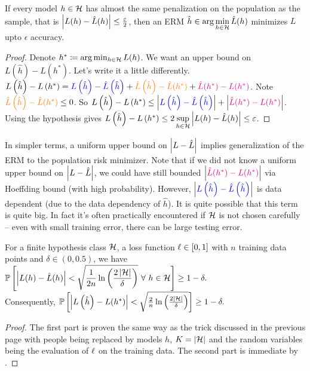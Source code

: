 \begin{prop}\label{prop:gen}
If every model $h\in {\mathcal{H}}$ has almost the same penalization on the population as the sample, that is $\left| L(h)-\hat L(h) \right| \le \frac{\varepsilon}{2}$, then an ERM $\hat h \in \arg\min\limits_{h\in{\mathcal{H}}} \hat L(h)$ minimizes $L$ upto $\epsilon$ accuracy.
\end{prop}
\begin{proof}
Denote $h^{*}\coloneqq \arg\min_{h\in{\mathcal{H}}}L(h)$. We want an upper bound on $L\left(\hat h\right) - L\left(h^{*}\right)$. Let's write it a little differently. $L\left(\hat h\right) - L\left(h^{*}\right) = {\color{blue}L\left(\hat h\right) - \hat L\left(\hat h\right)} + {\color{orange}\hat L\left(\hat h\right) - \hat L(h^{*})} + {\color{magenta}\hat L(h^{*}) - L(h^{*})}$. Note ${\color{orange}\hat L\left(\hat h\right) - \hat L(h^{*})} \le 0$. So $L\left(\hat h\right) - L\left(h^{*}\right) \le \left| {\color{blue}L\left(\hat h\right) - \hat L\left(\hat h\right)} \right| + \left| {\color{magenta}\hat L(h^{*}) - L(h^{*})} \right|$. Using the hypothesis gives $L\left(\hat h\right) - L\left(h^{*}\right) \le 2\sup\limits_{h\in{\mathcal{H}}} \left| L(h)-\hat L(h) \right| \le \varepsilon$.
\end{proof}

In simpler terms, a uniform upper bound on $\left| L-\hat L \right|$ implies generalization of the ERM to the population risk minimizer. Note that if we did not know a uniform upper bound on $\left| L-\hat L \right|$, we could have still bounded $\left| {\color{magenta}\hat L(h^{*}) - L(h^{*})} \right|$ via Hoeffding bound (with high probability). However, $\left| {\color{blue}L\left(\hat h\right) - \hat L\left(\hat h\right)} \right|$ is data dependent (due to the data dependency of $\hat h$). It is quite possible that this term is quite big. In fact it's often practically encountered if ${\mathcal{H}}$ is not chosen carefully -- even with small training error, there can be large testing error. 

\begin{cor}
For a finite hypothesis class ${\mathcal{H}}$, a loss function $\ell\in[0,1]$ with $n$ training data points and $\delta\in(0,0.5)$, we have $\displaystyle\mathbb P\left[ \left| L(h)-\hat L(h) \right| < \sqrt{\frac{1}{2n}\ln \left(\frac{2\left| {{\mathcal{H}}} \right|}{\delta}\right)}~\forall~ h\in{\mathcal{H}} \right] \ge 1-\delta.$ \\
Consequently, $\mathbb P\left[ \left| L\left(\hat h\right)- L(h^{*}) \right| < \sqrt{\frac{2}{n}\ln \left(\frac{2\left| {{\mathcal{H}}} \right|}{\delta}\right)} \right] \ge 1-\delta.$
\end{cor}
\begin{proof}
The first part is proven the same way as the trick discussed in the previous page with people being replaced by models $h$, $K = \left| {\mathcal{H}} \right|$ and the random variables being the evaluation of $\ell$ on the training data. The second part is immediate by .
\end{proof}

